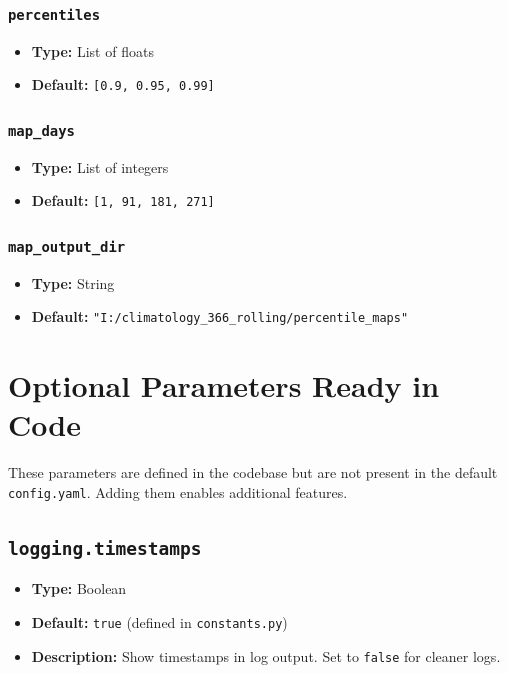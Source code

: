 \documentclass[12pt,a4paper]{article}
\begin{document}
\subsubsection{\texttt{percentiles}}
\begin{itemize}[leftmargin=*]
    \item \textbf{Type:} List of floats
    \item \textbf{Default:} \texttt{[0.9, 0.95, 0.99]}
\end{itemize}
\subsubsection{\texttt{map\_days}}
\begin{itemize}[leftmargin=*]
    \item \textbf{Type:} List of integers
    \item \textbf{Default:} \texttt{[1, 91, 181, 271]}
\end{itemize}
\subsubsection{\texttt{map\_output\_dir}}
\begin{itemize}[leftmargin=*]
    \item \textbf{Type:} String
    \item \textbf{Default:} \texttt{"I:/climatology\_366\_rolling/percentile\_maps"}
\end{itemize}

\section{Optional Parameters Ready in Code}

These parameters are defined in the codebase but are not present in the default \texttt{config.yaml}. Adding them enables additional features.

\subsection{\texttt{logging.timestamps}}
\begin{itemize}[leftmargin=*]
    \item \textbf{Type:} Boolean
    \item \textbf{Default:} \texttt{true} (defined in \texttt{constants.py})
    \item \textbf{Description:} Show timestamps in log output. Set to \texttt{false} for cleaner logs.
\end{itemize}
\end{document}
